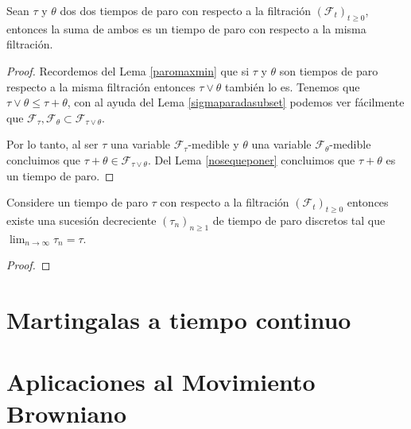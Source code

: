 \begin{lemma}
	Sean $\tau$ y $\theta$ dos dos tiempos de paro con respecto a la filtración $(\mathcal{F}_t)_{t \geq 0}$, entonces la suma de ambos es un tiempo de paro con respecto a la misma filtración.
\end{lemma}
\begin{proof}
	Recordemos del Lema \ref{paromaxmin} que si $\tau$ y $\theta$ son tiempos de paro respecto a la misma filtración entonces $\tau \vee \theta$ también lo es. Tenemos que $\tau \vee \theta \leq \tau + \theta$, con al ayuda del Lema \ref{sigmaparadasubset} podemos ver fácilmente que $\mathcal{F}_{\tau}, \mathcal{F}_{\theta} \subset \mathcal{F}_{\tau \vee \theta}$. 

	Por lo tanto, al ser $\tau$ una variable $\mathcal{F}_{\tau}$-medible y $\theta$ una variable $\mathcal{F}_{\theta}$-medible concluimos que $\tau + \theta \in \mathcal{F}_{\tau \vee \theta}$. Del Lema \ref{nosequeponer} concluimos que $\tau + \theta$ es un tiempo de paro.
\end{proof}

\begin{lemma}
	Considere un tiempo de paro $\tau$ con respecto a la filtración $(\mathcal{F}_t)_{t \geq 0}$ entonces existe una sucesión decreciente $(\tau_n)_{n \geq 1}$ de tiempo de paro discretos tal que $\lim_{n \rightarrow \infty} \tau_n = \tau$.
\end{lemma}
\begin{proof}
	
\end{proof}

\section{Martingalas a tiempo continuo}
\section{Aplicaciones al Movimiento Browniano}




